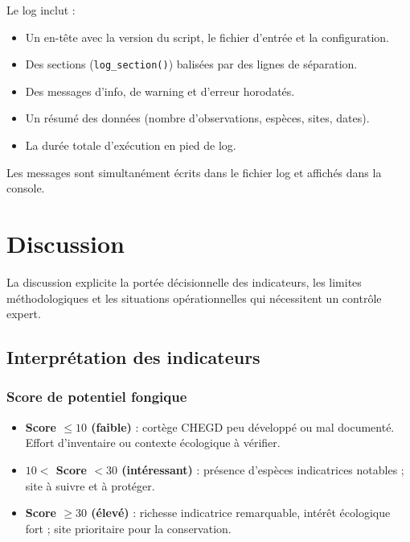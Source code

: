 \documentclass[11pt,a4paper]{article}
\begin{document}
Le log inclut :
\begin{itemize}
  \item Un en-tête avec la version du script, le fichier d'entrée et la configuration.
  \item Des sections (\texttt{log\_section()}) balisées par des lignes de séparation.
  \item Des messages d'info, de warning et d'erreur horodatés.
  \item Un résumé des données (nombre d'observations, espèces, sites, dates).
  \item La durée totale d'exécution en pied de log.
\end{itemize}

Les messages sont simultanément écrits dans le fichier log et affichés dans la console.

\section{Discussion}

La discussion explicite la portée décisionnelle des indicateurs, les limites méthodologiques
et les situations opérationnelles qui nécessitent un contrôle expert.

\subsection{Interprétation des indicateurs}

\subsubsection{Score de potentiel fongique}

\begin{itemize}
  \item \textbf{Score $\leq 10$ (faible)} : cortège CHEGD peu développé ou mal documenté. Effort d'inventaire ou contexte écologique à vérifier.
  \item \textbf{$10 <$ Score $< 30$ (intéressant)} : présence d'espèces indicatrices notables ; site à suivre et à protéger.
  \item \textbf{Score $\geq 30$ (élevé)} : richesse indicatrice remarquable, intérêt écologique fort ; site prioritaire pour la conservation.
\end{itemize}
\end{document}
